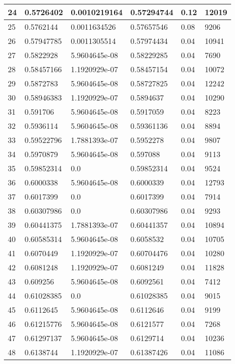\begin{longtable}{|l|l|l|l|l|l|}
24 & 0.5726402 & 0.0010219164 & 0.57294744 & 0.12 & 12019 \\ \hline 
25 & 0.5762144 & 0.0011634526 & 0.57657546 & 0.08 & 9206 \\ \hline 
26 & 0.57947785 & 0.0011305514 & 0.57974434 & 0.04 & 10941 \\ \hline 
27 & 0.5822928 & 5.9604645e-08 & 0.58229285 & 0.04 & 7690 \\ \hline 
28 & 0.58457166 & 1.1920929e-07 & 0.58457154 & 0.04 & 10072 \\ \hline 
29 & 0.5872783 & 5.9604645e-08 & 0.58727825 & 0.04 & 12242 \\ \hline 
30 & 0.58946383 & 1.1920929e-07 & 0.5894637 & 0.04 & 10290 \\ \hline 
31 & 0.591706 & 5.9604645e-08 & 0.5917059 & 0.04 & 8223 \\ \hline 
32 & 0.5936114 & 5.9604645e-08 & 0.59361136 & 0.04 & 8894 \\ \hline 
33 & 0.59522796 & 1.7881393e-07 & 0.5952278 & 0.04 & 9807 \\ \hline 
34 & 0.5970879 & 5.9604645e-08 & 0.597088 & 0.04 & 9113 \\ \hline 
35 & 0.59852314 & 0.0 & 0.59852314 & 0.04 & 9524 \\ \hline 
36 & 0.6000338 & 5.9604645e-08 & 0.6000339 & 0.04 & 12793 \\ \hline 
37 & 0.6017399 & 0.0 & 0.6017399 & 0.04 & 7914 \\ \hline 
38 & 0.60307986 & 0.0 & 0.60307986 & 0.04 & 9293 \\ \hline 
39 & 0.60441375 & 1.7881393e-07 & 0.60441357 & 0.04 & 10894 \\ \hline 
40 & 0.60585314 & 5.9604645e-08 & 0.6058532 & 0.04 & 10705 \\ \hline 
41 & 0.6070449 & 1.1920929e-07 & 0.60704476 & 0.04 & 10280 \\ \hline 
42 & 0.6081248 & 1.1920929e-07 & 0.6081249 & 0.04 & 11828 \\ \hline 
43 & 0.609256 & 5.9604645e-08 & 0.6092561 & 0.04 & 7412 \\ \hline 
44 & 0.61028385 & 0.0 & 0.61028385 & 0.04 & 9015 \\ \hline 
45 & 0.6112645 & 5.9604645e-08 & 0.6112646 & 0.04 & 9199 \\ \hline 
46 & 0.61215776 & 5.9604645e-08 & 0.6121577 & 0.04 & 7268 \\ \hline 
47 & 0.61297137 & 5.9604645e-08 & 0.6129714 & 0.04 & 10236 \\ \hline 
48 & 0.6138744 & 1.1920929e-07 & 0.61387426 & 0.04 & 11086 \\ \hline 

\end{longtable}
